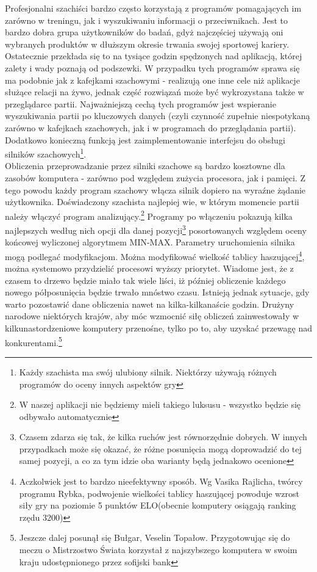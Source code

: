 \documentclass[12pt,leqno]{article}
\begin{document}
Profesjonalni szachiści bardzo często korzystają z programów pomagających im zarówno w treningu, jak i wyszukiwaniu informacji o przeciwnikach. Jest to bardzo dobra grupa użytkowników do badań, gdyż najczęściej używają oni wybranych produktów w dłuższym okresie trwania swojej sportowej kariery. Ostatecznie przekłada się to na tysiące godzin spędzonych nad aplikacją, której zalety i wady poznają od podszewki. W przypadku tych programów sprawa się ma podobnie jak z kafejkami szachowymi - realizują one inne cele niż aplikacje służące relacji na żywo, jednak część rozwiązań może być wykrozystana także w przeglądarce partii. Najważniejszą cechą tych programów jest wspieranie wyszukiwania partii po kluczowych danych (czyli czynność zupełnie niespotykaną zarówno w kafejkach szachowych, jak i w programach do przeglądania partii). Dodatkowo konieczną funkcją jest zaimplementowanie interfejsu do obsługi silników szachowych\footnote{Każdy szachista ma swój ulubiony silnik. Niektórzy używają różnych programów do oceny innych aspektów gry}. \\
\indent Obliczenia przeprowadzanie przez silniki szachowe są bardzo kosztowne dla zasobów komputera - zarówno pod względem zużycia procesora, jak i pamięci. Z tego powodu każdy program szachowy włącza silnik dopiero na wyraźne żądanie użytkownika. Doświadczony szachista najlepiej wie, w którym momencie partii należy włączyć program analizujący.\footnote{W naszej aplikacji nie będziemy mieli takiego luksusu - wszystko będzie się odbywało automatycznie} Programy po włączeniu pokazują kilka najlepszych według nich opcji dla danej pozycji\footnote{Czasem zdarza się tak, że kilka ruchów jest równorzędnie dobrych. W innych przypadkach może się okazać, że różne posunięcia mogą doprowadzić do tej samej pozycji, a co za tym idzie oba warianty będą jednakowo ocenione} posortowanych względem oceny końcowej wyliczonej algorytmem MIN-MAX. Parametry uruchomienia silnika mogą podlegać modyfikacjom. Można modyfikować wielkość tablicy haszującej\footnote{Aczkolwiek jest to bardzo nieefektywny sposób. Wg Vasika Rajlicha, twórcy programu Rybka, podwojenie wielkości tablicy haszującej powoduje wzrost siły gry na poziomie 5 punktów ELO(obecnie komputery osiągają ranking rzędu 3200)}, można systemowo przydzielić procesowi wyższy priorytet. Wiadome jest, że z czasem to drzewo będzie miało tak wiele liści, iż później obliczenie każdego nowego półposunięcia będzie trwało mnóstwo czasu. Istnieją jednak sytuacje, gdy warto pozostawić dane obliczenia nawet na kilka-kilkanaście godzin. Drużyny narodowe niektórych krajów, aby móc wzmocnić siłę obliczeń zainwestowały w kilkunastordzeniowe komputery przenośne, tylko po to, aby uzyskać przewagę nad konkurentami.\footnote{Jeszcze dalej posunął się Bułgar, Veselin Topałow. Przygotowując się do meczu o Mistrzostwo Świata korzystał z najszybszego komputera w swoim kraju udostępnionego przez sofijski bank}\\
\end{document}
